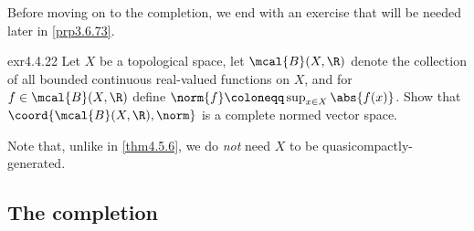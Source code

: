 Before moving on to the completion, we end with an exercise that will be needed later in \cref{prp3.6.73}.
\begin{exr}{}{exr4.4.22}
Let $X$ be a topological space, let $\mcal{B}(X,\R )$ denote the collection of all bounded continuous real-valued functions on $X$, and for $f\in \mcal{B}(X,\R )$ define $\norm{f}\coloneqq \sup _{x\in X}\abs{f(x)}$.  Show that $\coord{\mcal{B}(X,\R ),\norm}$ is a complete normed vector space.
\begin{rmk}
Note that, unlike in \cref{thm4.5.6}, we do \emph{not} need $X$ to be quasicompactly-generated.
\end{rmk}
\end{exr}

\subsection{The completion}

